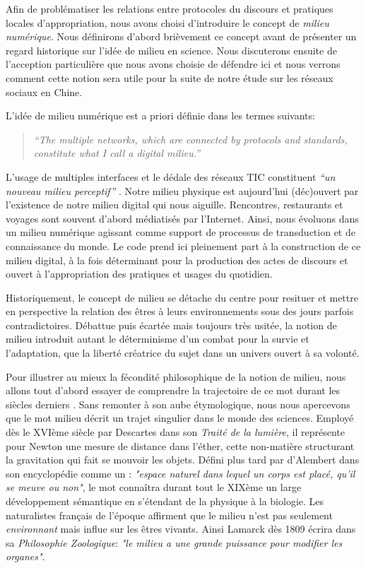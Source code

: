 Afin de problématiser les relations entre protocoles du discours et pratiques locales d’appropriation, nous avons choisi d’introduire le concept de \textit{milieu numérique}. Nous définirons d’abord brièvement ce concept avant de présenter un regard historique sur l’idée de milieu en science. Nous discuterons ensuite de l’acception particulière que nous avons choisie de défendre ici et nous verrons comment cette notion sera utile pour la suite de notre étude sur les réseaux sociaux en Chine.

L’idée de milieu numérique est a priori définie dans les termes suivants:

\begin{quote}
    \textit{``The multiple networks, which are connected by protocols and standards, constitute what I call a digital milieu.''} \citep{Hui2012}
\end{quote}

L’usage de multiples interfaces et le dédale des réseaux TIC constituent \textit{``un nouveau milieu perceptif''} \citep{Barboza2006}. Notre milieu physique est aujourd’hui (déc)ouvert par l’existence de notre milieu digital qui nous aiguille. Rencontres, restaurants et voyages sont souvent d'abord médiatisés par l’Internet. Ainsi, nous évoluons dans un milieu numérique agissant comme support de processus de transduction et de connaissance du monde. Le code prend ici pleinement part à la construction de ce milieu digital, à la fois déterminant pour la production des actes de discours et ouvert à l’appropriation des pratiques et usages du quotidien.

Historiquement, le concept de milieu se détache du centre pour resituer et mettre en perspective la relation des êtres à leurs environnements sous des jours parfois contradictoires. Débattue puis écartée mais toujours très usitée, la notion de milieu introduit autant le déterminisme d’un combat pour la survie et l’adaptation, que la liberté créatrice du sujet dans un univers ouvert à sa volonté. 

Pour illustrer au mieux la fécondité philosophique de la notion de milieu, nous allons tout d’abord essayer de comprendre la trajectoire de ce mot durant les siècles derniers \citep{Canguilhem1965}. Sans remonter à son aube étymologique, nous nous apercevons que le mot milieu décrit un trajet singulier dans le monde des sciences. Employé dès le XVIème siècle par Descartes dans son \textit{Traité de la lumière}, il représente pour Newton une mesure de distance dans l’éther, cette non-matière  structurant la gravitation qui fait se mouvoir les objets. Défini plus tard par d'Alembert dans son encyclopédie comme un : \textit{"espace naturel dans lequel un corps est placé, qu'il se meuve ou non"}, le mot connaîtra durant tout le XIXème un large développement sémantique en s'étendant de la physique à la biologie. Les naturalistes français de l’époque affirment que le milieu n’est pas seulement \textit{environnant} mais influe sur les êtres vivants. Ainsi Lamarck dès 1809 écrira dans sa \textit{Philosophie Zoologique}: \textit{"le milieu a une grande puissance pour modifier les organes"}. 

